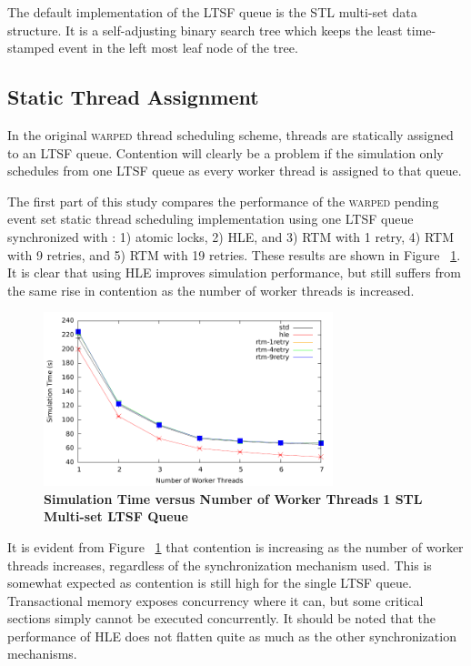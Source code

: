 \documentclass[11pt]{book}
\begin{document}
The default implementation of the LTSF queue is the STL multi-set data
structure.  It is a self-adjusting binary search tree which keeps the least
time-stamped event in the left most leaf node of the tree.

\subsection{Static Thread Assignment}

In the original \textsc{warped} thread scheduling scheme, threads are
statically assigned to an LTSF queue.  Contention will clearly be a problem if
the simulation only schedules from one LTSF queue as every worker thread is
assigned to that queue.

The first part of this study compares the performance of the \textsc{warped}
pending event set static thread scheduling implementation using one LTSF queue
synchronized with : 1) atomic locks, 2) HLE, and 3) RTM with 1 retry, 4) RTM
with 9 retries, and 5) RTM with 19 retries.  These results are shown in Figure
~\ref{fig:noThrMig_timeVSthreads_1schq}.  It is clear that using HLE improves
simulation performance, but still suffers from the same rise in contention as
the number of worker threads is increased.

\begin{figure}[H]
    \centering
    \graphicspath{ {./figures/} }
    \includegraphics[width=0.75\textwidth,keepaspectratio]{noThrMig-hugeEpidemicSim-timeVSthreads-multiset-1schQ}
    \caption{\textbf{Simulation Time versus Number of Worker Threads 1 STL Multi-set LTSF Queue}}
    \label{fig:noThrMig_timeVSthreads_1schq}
\end{figure}

It is evident from Figure ~\ref{fig:noThrMig_timeVSthreads_1schq} that
contention is increasing as the number of worker threads increases, regardless
of the synchronization mechanism used.  This is somewhat expected as contention
is still high for the single LTSF queue.  Transactional memory exposes
concurrency where it can, but some critical sections simply cannot be executed
concurrently.  It should be noted that the performance of HLE does not flatten
quite as much as the other synchronization mechanisms.
\end{document}
